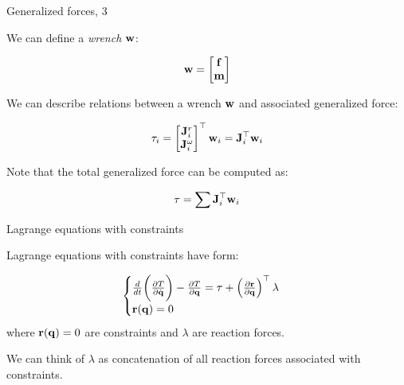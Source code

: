 \documentclass{beamer}
\begin{document}
\begin{frame}{Generalized forces, 3}
	\begin{flushleft}
		
		We can define a \emph{wrench} $\mathbf{w}$:
		
		\begin{equation}
			\mathbf{w} = \begin{bmatrix}
				\mathbf{f} \\ \mathbf{m}
			\end{bmatrix}
		\end{equation}
		
		We can describe relations between a wrench $\mathbf{w}$ and associated generalized force:
		
		\begin{equation}
			\tau_i = \begin{bmatrix}
				\mathbf{J}^r_i \\ \mathbf{J}^\omega_i
			\end{bmatrix}^\top
		\mathbf{w}_i
		=
		\mathbf{J}_i^\top \mathbf{w}_i
		\end{equation}

\bigskip

Note that the total generalized force can be computed as:

\begin{equation}
	\tau = \sum \mathbf{J}_i^\top \mathbf{w}_i
\end{equation}
		
	\end{flushleft}
\end{frame}


\begin{frame}{Lagrange equations with constraints}
	\begin{flushleft}
		
		Lagrange equations with constraints have form:
		
		\begin{equation}
			\begin{cases}
				\frac{d}{dt} \bigg( 
				\frac{\partial T }{\partial \dot{\mathbf{q}}}
				\bigg) - 
				\frac{\partial T }{\partial \mathbf{q}} = \tau + \left( \frac{\partial \mathbf{r}}{\partial  \mathbf{q}} \right)^\top \lambda
				\\
				\mathbf{r}(\mathbf{q}) = 0
			\end{cases}
		\end{equation}
		where $\mathbf{r}(\mathbf{q}) = 0$ are constraints and $\lambda$ are reaction forces.

		\bigskip
		
		We can think of $\lambda$ as concatenation of all reaction forces associated with constraints.
		
	\end{flushleft}
\end{frame}
\end{document}
